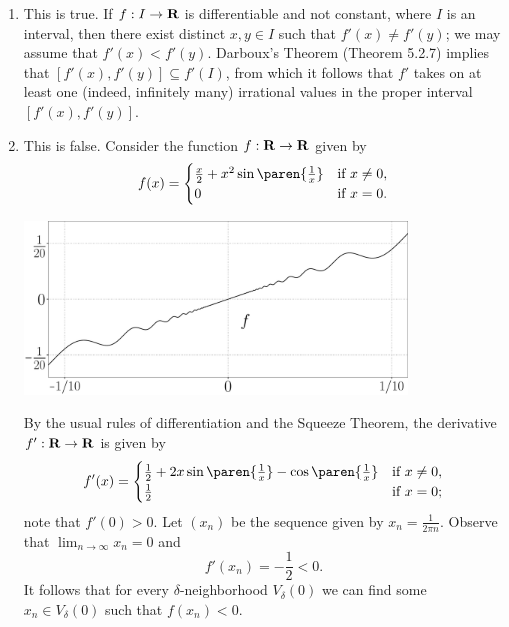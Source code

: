 \documentclass{lew98_solutions}
\begin{document}
\begin{solution}
    \begin{enumerate}
        \item This is true. If \( f : I \to \mathbf{R} \) is differentiable and not constant, where \( I \) is an interval, then there exist distinct \( x, y \in I \) such that \( f'(x) \neq f'(y) \); we may assume that \( f'(x) < f'(y) \). Darboux's Theorem (Theorem 5.2.7) implies that \( [f'(x), f'(y)] \subseteq f'(I) \), from which it follows that \( f' \) takes on at least one (indeed, infinitely many) irrational values in the proper interval \( [f'(x), f'(y)] \).

        \item This is false. Consider the function \( f : \mathbf{R} \to \mathbf{R} \) given by
        \[
            f(x) = \begin{cases}
                \tfrac{x}{2} + x^2 \sin \paren{\tfrac{1}{x}} & \text{if } x \neq 0, \\
                0 & \text{if } x = 0.
            \end{cases}
        \]
        \begin{center}
            \includegraphics[width=0.8\textwidth]{UA_Figures/UA_ex5_2_9_fig_1.pdf}
        \end{center}
        By the usual rules of differentiation and the Squeeze Theorem, the derivative \( f' : \mathbf{R} \to \mathbf{R} \) is given by
        \[
            f'(x) = \begin{cases}
                \tfrac{1}{2} + 2 x \sin \paren{\tfrac{1}{x}} - \cos \paren{\tfrac{1}{x}} & \text{if } x \neq 0, \\
                \tfrac{1}{2} & \text{if } x = 0;
            \end{cases}
        \]
        note that \( f'(0) > 0 \). Let \( (x_n) \) be the sequence given by \( x_n = \tfrac{1}{2 \pi n} \). Observe that \( \lim_{n \to \infty} x_n = 0 \) and
        \[
            f'(x_n) = -\frac{1}{2} < 0.
        \]
        It follows that for every \( \delta \)-neighborhood \( V_{\delta}(0) \) we can find some \( x_n \in V_{\delta}(0) \) such that \( f(x_n) < 0 \).

\end{enumerate}
\end{solution}
\end{document}
